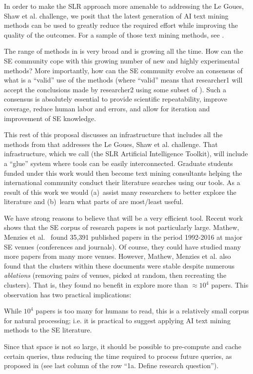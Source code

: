

In order to make the SLR approach more amenable to addressing the Le  Goues,  Shaw  et  al. challenge, we posit that the latest generation of AI text mining methods can be used to greatly reduce the required effort while improving the quality of the outcomes. For a sample of those text mining methods, see .


The range of methods in  is very broad and  is growing all the time. 
How can the SE community cope with this growing number of  new and highly experimental methods?
More importantly, how can the SE community evolve an consensus of what is a ``valid'' use of the  methods (where ``valid'' means that researcher1 will accept the conclusions made by researcher2 using some subset of ). 
Such a consensus is absolutely essential  to provide scientific repeatability, improve coverage, reduce human labor and errors, and allow for iteration and improvement of SE knowledge. 


This rest of this proposal
discusses an infrastructure that includes all the methods from  that 
 addresses the Le  Goues,  Shaw  et  al. challenge.  
 That infrastructure, which we call {\IT} (the SLR Artificial Intelligence Toolkit), will include a ``glue'' system where tools can be easily interconnected. Graduate students funded under this work would then become text mining consultants helping the international community conduct their literature searches using our tools. As a result of this work we would (a)~assist many researchers to better
 explore the literature and (b)~learn what parts of  are most/least useful.
 
We have strong reasons to believe that  {\IT}
will be a very efficient tool. 
Recent work
shows that 
the SE corpus of research papers is not particularly large. 
Mathew, Menzies et al.~\cite{Mathew_2018,mathewSoft18}
found 35,391  published papers in the period 1992-2016
at major SE venues (conferences and journals).
Of course, they could have studied many more papers from many more venues. However, Mathew, Menzies et al. also found that the  clusters within these documents were stable despite
numerous {\em ablations} (removing  pairs of venues, picked at random,
then recreating the clusters). That is, they found no benefit in explore more than $\approx10^4$ papers. 
This observation  has  two practical implications:
\bi
\item
While $10^4$  papers is too many   for humans to read,  this is a relatively small corpus for natural processing; i.e.  it is 
practical to suggest applying
AI text mining methods to the SE literature.
\item
Since that space is not so large,
  it should be possible to pre-compute and cache certain queries, thus reducing the time required to process future queries, as  proposed in  (see last column of the row ``1a. Define research question'').
\ei

